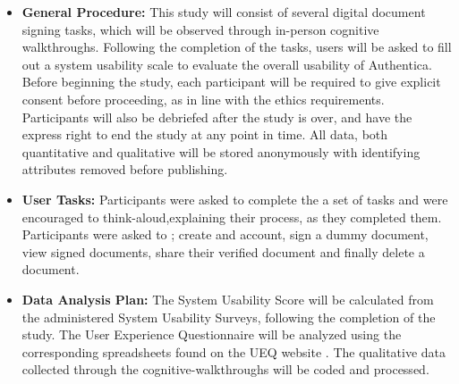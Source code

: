 \documentclass[a4,12pt]{article}
\begin{document}
\begin{itemize}[leftmargin=*, label={}]
\item \textbf{General Procedure:} This study will consist of several digital document signing tasks, which will be observed through in-person cognitive walkthroughs. Following the completion of the tasks, users will be asked to fill out a system usability scale to evaluate the overall usability of Authentica. Before beginning the study, each participant will be required to give explicit consent before proceeding, as in line with the ethics requirements. Participants will also be debriefed after the study is over, and have the express right to end the study at any point in time. All data, both quantitative and qualitative will be stored anonymously with identifying attributes removed before publishing.

\item \textbf{User Tasks:} Participants were asked to complete the a set of tasks and were encouraged to think-aloud,explaining their process, as they completed them. Participants were asked to ; create and account, sign a dummy document, view signed documents, share their verified document and finally delete a document.


\item \textbf{Data Analysis Plan:} The System Usability Score will be calculated from the administered System Usability Surveys, following the completion of the study. The User Experience Questionnaire will be analyzed using the corresponding spreadsheets found on the UEQ website \cite{ueq}. The qualitative data collected through the cognitive-walkthroughs will be coded and processed.

\end{itemize}

\end{document}
